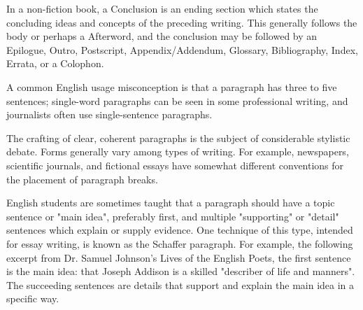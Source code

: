 In a non-fiction book, a Conclusion is an ending section which states the concluding ideas and concepts of the preceding writing. This generally follows the body or perhaps a Afterword, and the conclusion may be followed by an Epilogue, Outro, Postscript, Appendix/Addendum, Glossary, Bibliography, Index, Errata, or a Colophon.

A common English usage misconception is that a paragraph has three to five sentences; single-word paragraphs can be seen in some professional writing, and journalists often use single-sentence paragraphs.

The crafting of clear, coherent paragraphs is the subject of considerable stylistic debate. Forms generally vary among types of writing. For example, newspapers, scientific journals, and fictional essays have somewhat different conventions for the placement of paragraph breaks.

English students are sometimes taught that a paragraph should have a topic sentence or "main idea", preferably first, and multiple "supporting" or "detail" sentences which explain or supply evidence. One technique of this type, intended for essay writing, is known as the Schaffer paragraph. For example, the following excerpt from Dr. Samuel Johnson's Lives of the English Poets, the first sentence is the main idea: that Joseph Addison is a skilled "describer of life and manners". The succeeding sentences are details that support and explain the main idea in a specific way.


